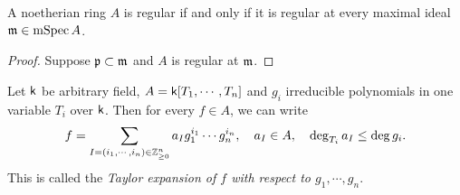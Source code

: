     \begin{proposition}\label{prop: regularity is a local property}
        A noetherian ring \(A\) is regular if and only if it is regular at every maximal ideal \({\mathfrak{m}} \in \operatorname{mSpec} A\). 
    \end{proposition}
    \begin{proof}
        Suppose \({\mathfrak{p}} \subset {\mathfrak{m}}\) and \(A\) is regular at \({\mathfrak{m}}\).
        
    \end{proof}




    \begin{remark}\label{remark: Taylor expansion with respect to irreducible polynomials}
        Let \({\mathsf{k}}\) be arbitrary field, \(A = {\mathsf{k}}[T_1,\cdots,T_n]\) and \(g_i\) irreducible polynomials in one variable \(T_i\) over \({\mathsf{k}}\).
        Then for every \(f \in A\), we can write
        \[ f = \sum_{I=(i_1,\cdots,i_n) \in {\mathbb{Z}}_{\geq 0}^n} a_I g_1^{i_1}\cdots g_n^{i_n}, \quad a_I \in A, \quad \deg_{T_i} a_I \leq \deg g_i.\]
        This is called the \textit{Taylor expansion of \(f\) with respect to \(g_1,\cdots,g_n\)}. 
    \end{remark}


